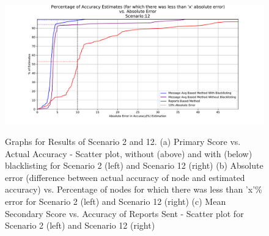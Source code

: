 \documentclass[journal]{IEEEtran}
\begin{document}
\begin{figure}[!ht]
{		\includegraphics[width=0.5\linewidth, trim={80 25 90 50}, clip]{images/SCN12_AbsoluteErrorsInEstimationComparison.pdf}
	}
	\hfill
	\caption{Graphs for Results of Scenario 2 and 12. (a) Primary Score vs. Actual Accuracy - Scatter plot, without (above) and with (below) blacklisting for Scenario 2 (left) and Scenario 12 (right) (b) Absolute error (difference between actual accuracy of node and estimated accuracy) vs. Percentage of nodes for which there was less than 'x'\% error for Scenario 2 (left) and Scenario 12 (right) (c) Mean Secondary Score vs. Accuracy of Reports Sent - Scatter plot for Scenario 2 (left) and Scenario 12 (right)}
	\label{fig:apdx:ev2}
\end{figure}
\iffalse
\end{document}
